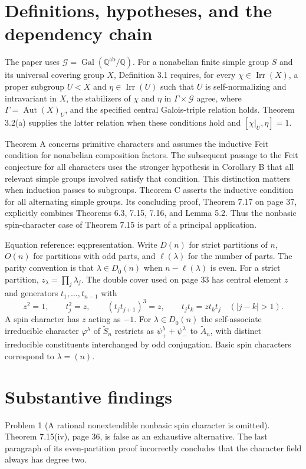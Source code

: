 \documentclass[10pt]{article}
\begin{document}
\section*{Definitions, hypotheses, and the dependency chain}
The paper uses \(\mathcal G=\operatorname{Gal}(\mathbb{Q}^{\mathrm{ab}}/\mathbb{Q})\). For a nonabelian finite simple group \(S\) and its universal covering group \(X\), Definition 3.1 requires, for every \(\chi\in\operatorname{Irr}(X)\), a proper subgroup \(U<X\) and \(\eta\in\operatorname{Irr}(U)\) such that \(U\) is self-normalizing and intravariant in \(X\), the stabilizers of \(\chi\) and \(\eta\) in \(\Gamma\times\mathcal G\) agree, where \(\Gamma=\operatorname{Aut}(X)_U\), and the specified central Galois-triple relation holds. Theorem 3.2(a) supplies the latter relation when these conditions hold and \([\chi|_U,\eta]=1\).\par
Theorem A concerns primitive characters and assumes the inductive Feit condition for nonabelian composition factors. The subsequent passage to the Feit conjecture for all characters uses the stronger hypothesis in Corollary B that all relevant simple groups involved satisfy that condition. This distinction matters when induction passes to subgroups. Theorem C asserts the inductive condition for all alternating simple groups. Its concluding proof, Theorem 7.17 on page 37, explicitly combines Theorems 6.3, 7.15, 7.16, and Lemma 5.2. Thus the nonbasic spin-character case of Theorem 7.15 is part of a principal application.\par
Equation reference: eq:presentation. Write \(D(n)\) for strict partitions of \(n\), \(O(n)\) for partitions with odd parts, and \(\ell(\lambda)\) for the number of parts. The parity convention is that \(\lambda\in D_{\bar0}(n)\) when \(n-\ell(\lambda)\) is even. For a strict partition, \(z_\lambda=\prod_j\lambda_j\). The double cover used on page 33 has central element \(z\) and generators \(t_1,\ldots,t_{n-1}\) with \[
 z^2=1,\qquad t_j^2=z,\qquad (t_jt_{j+1})^3=z,\qquad
 t_jt_k=zt_kt_j\quad (|j-k|>1).\] A spin character has \(z\) acting as \(-1\). For \(\lambda\in D_{\bar0}(n)\) the self-associate irreducible character \(\varphi^\lambda\) of \(\widetilde S_n\) restricts as \(\psi^\lambda_++\psi^\lambda_-\) to \(\widetilde A_n\), with distinct irreducible constituents interchanged by odd conjugation. Basic spin characters correspond to \(\lambda=(n)\).\par
\section*{Substantive findings}
Problem 1 (A rational nonextendible nonbasic spin character is omitted).  Theorem 7.15(iv), page 36, is false as an exhaustive alternative. The last paragraph of its even-partition proof incorrectly concludes that the character field always has degree two.\par
\end{document}
